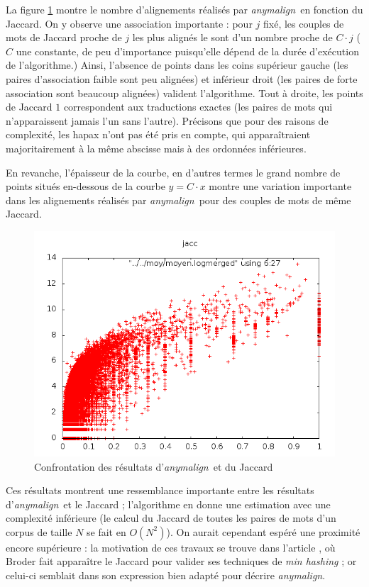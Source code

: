 \documentclass[a4paper,10pt]{article}
\newcommand{\anym}{\emph{anymalign}}
\begin{document}
La figure \ref{jaccard} montre le nombre d'alignements %
 réalisés par \anym~en fonction du Jaccard. On y observe une association importante : 
pour $j$ fixé, les couples de mots de Jaccard proche de $j$ les plus alignés le sont d'un nombre proche de $C\cdot j$ ($C$ une constante, de peu d'importance puisqu'elle dépend de la durée d'exécution de l'algorithme.) Ainsi, l'absence de points dans les coins supérieur gauche (les paires d'association faible sont peu alignées) et inférieur droit (les paires de forte association sont beaucoup alignées) valident l'algorithme. Tout à droite, les points de Jaccard $1$ correspondent aux traductions exactes (les paires de mots qui n'apparaissent jamais l'un sans l'autre). Précisons que pour des raisons de complexité, les hapax n'ont pas été pris en compte, qui apparaîtraient majoritairement à la même abscisse mais à des ordonnées inférieures.

En revanche, l'épaisseur de la courbe, en d'autres termes le grand nombre de points situés en-dessous de la courbe $y = C\cdot x$ montre une variation importante dans les alignements réalisés par \anym~pour des couples de mots de même Jaccard.

\begin{figure}[t]
\centering
\includegraphics[width=12cm]{jacclog.png} %
\caption{Confrontation des résultats d'\anym~et du Jaccard}
\label{jaccard}
\end{figure}

Ces résultats montrent une ressemblance importante entre les résultats d'\anym~et le Jaccard ; l'algorithme en donne une estimation avec une complexité inférieure (le calcul du Jaccard de toutes les paires de mots d'un corpus de taille $N$ se fait en $O(N^2)$).
On aurait cependant espéré une proximité encore supérieure : la motivation de ces travaux se trouve dans l'article \cite{broder2000identifying}, où Broder fait apparaître le Jaccard pour valider ses techniques de \emph{min hashing} ; or celui-ci semblait dans son expression bien adapté pour décrire \anym.
\end{document}
